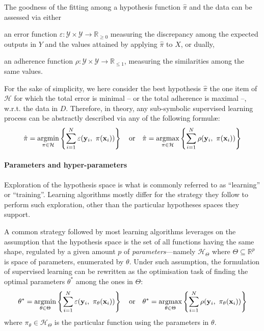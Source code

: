 \documentclass[12pt,a4paper,openright,twoside]{book}
\begin{document}
The goodness of the fitting among a hypothesis function $\hat{\pi}$ and the data can be assessed via either
%
\begin{inlinelist}
    \item an error function $\varepsilon : \mathcal{Y} \times \mathcal{Y} \rightarrow \mathbb{R}_{\geq 0}$ measuring the discrepancy among the expected outputs in $Y$ and the values attained by applying $\hat{\pi}$ to $X$, or dually,
    \item an adherence function $\rho : \mathcal{Y} \times \mathcal{Y} \rightarrow \mathbb{R}_{\leq 1}$, measuring the similarities among the same values.
\end{inlinelist}
%
For the sake of simplicity, we here consider the best hypothesis $\hat{\pi}$ the one item of $\mathcal{H}$ for which the total error is minimal -- or the total adherence is maximal --, w.r.t. the data in $D$.
%
Therefore, in theory, any sub-symbolic supervised learning process can be abstractly described via any of the following formul\ae{}:
%
$$
\hat{\pi} = \underset{\pi \in \mathcal{H}}{\text{argmin}} \left\{  \sum_{i=1}^{N} \varepsilon(\mathbf{y}_i,\ \pi(\mathbf{x}_i))  \right\}
\quad \text{or} \quad
\hat{\pi} = \underset{\pi \in \mathcal{H}}{\text{argmax}} \left\{  \sum_{i=1}^{N} \rho(\mathbf{y}_i,\ \pi(\mathbf{x}_i))  \right\}
$$

\paragraph{Parameters and hyper-parameters}

Exploration of the hypothesis space is what is commonly referred to as ``learning'' or ``training''.
%
Learning algorithms mostly differ for the strategy they follow to perform such exploration, other than the particular hypotheses spaces they support.

A common strategy followed by most learning algorithms leverages on the assumption that the hypothesis space is the set of all functions having the same shape, regulated by a given amount $p$ of \emph{parameters}---namely $\mathcal{H}_\Theta$ where $\Theta \subseteq \mathbb{R}^p$ is space of parameters, enumerated by $\theta$.
Under such assumption, the formulation of supervised learning can be rewritten as the optimisation task of finding the optimal parameters $\theta^*$ among the ones in $\Theta$:
%
$$
\theta^* = \underset{\theta \in \Theta}{\text{argmin}} \left\{  \sum_{i=1}^{N} \varepsilon(\mathbf{y}_i,\ \pi_\theta(\mathbf{x}_i))  \right\}
\quad \text{or} \quad
\theta^* = \underset{\theta \in \Theta}{\text{argmax}} \left\{  \sum_{i=1}^{N} \rho(\mathbf{y}_i,\ \pi_\theta(\mathbf{x}_i))  \right\}
$$
%
where $\pi_\theta \in \mathcal{H}_\Theta$ is the particular function using the parameters in $\theta$.
\end{document}
